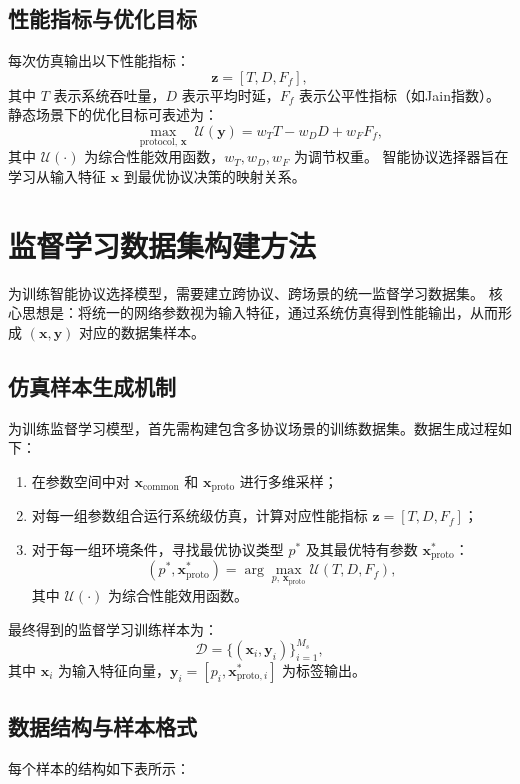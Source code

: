 \subsection{性能指标与优化目标}

每次仿真输出以下性能指标：
\[
\mathbf{z} = [T, D, F_f],
\]
其中 $T$ 表示系统吞吐量，$D$ 表示平均时延，$F_f$ 表示公平性指标（如Jain指数）。  
静态场景下的优化目标可表述为：
\[
\max_{\text{protocol},\, \mathbf{x}} \; \mathcal{U}(\mathbf{y}) = w_T T - w_D D + w_F F_f,
\]
其中 $\mathcal{U}(\cdot)$ 为综合性能效用函数，$w_T, w_D, w_F$ 为调节权重。  
智能协议选择器旨在学习从输入特征 $\mathbf{x}$ 到最优协议决策的映射关系。

\section{监督学习数据集构建方法}
\label{sec:dataset_construction}

为训练智能协议选择模型，需要建立跨协议、跨场景的统一监督学习数据集。  
核心思想是：将统一的网络参数视为输入特征，通过系统仿真得到性能输出，从而形成 $(\mathbf{x}, \mathbf{y})$ 对应的数据集样本。

\subsection{仿真样本生成机制}
为训练监督学习模型，首先需构建包含多协议场景的训练数据集。数据生成过程如下：
\begin{enumerate}
	\item 在参数空间中对 $\mathbf{x}_\text{common}$ 和 $\mathbf{x}_\text{proto}$ 进行多维采样；
	\item 对每一组参数组合运行系统级仿真，计算对应性能指标 $\mathbf{z} = [T, D, F_f]$；
	\item 对于每一组环境条件，寻找最优协议类型 $p^*$ 及其最优特有参数 $\mathbf{x}^*_\text{proto}$：
	\[
	(p^*, \mathbf{x}^*_\text{proto}) = \arg\max_{p,\, \mathbf{x}_\text{proto}} \mathcal{U}(T, D, F_f),
	\]
	其中 $\mathcal{U}(\cdot)$ 为综合性能效用函数。
\end{enumerate}
最终得到的监督学习训练样本为：
\[
\mathcal{D} = \{(\mathbf{x}_i, \mathbf{y}_i)\}_{i=1}^{M_s},
\]
其中 $\mathbf{x}_i$ 为输入特征向量，$\mathbf{y}_i = [p_i, \mathbf{x}^*_{\text{proto},i}]$ 为标签输出。

\subsection{数据结构与样本格式}
每个样本的结构如下表所示：

